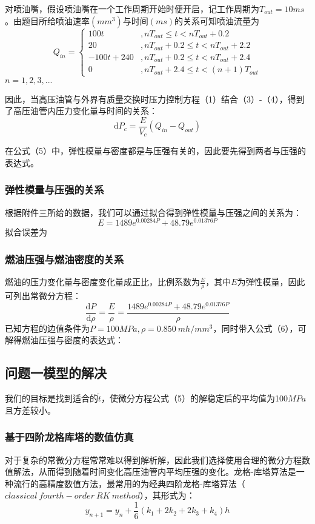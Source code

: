 \documentclass[withoutpreface,bwprint]{cumcmthesis} %
\begin{document}
对喷油嘴，假设喷油嘴在一个工作周期开始时便开启，记工作周期为$T_{out} = 10 ms$。由题目所给喷油速率$(mm^3)$与时间$(ms)$的关系可知喷油流量为
\begin{equation}
Q_{in} = \left\{ 
\begin{array}{ll}
100t&,nT_{out}\leq t<nT_{out}+0.2 \\
20&,nT_{out}+0.2\leq t< nT_{out}+2.2\\
-100t+240&,nT_{out}+0.2\leq t< nT_{out}+2.4\\
0&,nT_{out}+2.4\leq t <(n+1)T_{out}
\end{array}
\right.
\end{equation}
$n = 1,2,3,...$

因此，当高压油管与外界有质量交换时压力控制方程（1）结合（3）-（4），得到了高压油管内压力变化量与时间的关系：
\begin{equation}
	\mathrm{d}P_c = \frac{E}{V_c}(Q_{in} - Q_{out})
\end{equation}

在公式（5）中，弹性模量与密度都是与压强有关的，因此要先得到两者与压强的表达式。
\subsubsection{弹性模量与压强的关系}
根据附件三所给的数据，我们可以通过拟合得到弹性模量与压强之间的关系为：
\begin{equation}
E = 1489 e^{0.00284P} + 48.79 e^{0.01376 P}
\end{equation}
拟合误差为


\subsubsection{燃油压强与燃油密度的关系}
燃油的压力变化量与密度变化量成正比，比例系数为$\frac{E}{\rho}$，其中$E$为弹性模量，因此可列出常微分方程：
\begin{equation}
\frac{\mathrm{d}P}{\mathrm{d}\rho} = \frac{E}{\rho} = \frac{1489 e^{0.00284P} + 48.79 e^{0.01376 P}}{\rho}
\end{equation}
已知方程的边值条件为$P = 100MPa, \rho = 0.850\ mh/mm^3$，同时带入公式（6），可解得燃油压强与密度的表达式：
\subsection{问题一模型的解决}
我们的目标是找到适合的$\widetilde{t}$，使微分方程公式（5）的解稳定后的平均值为100$MPa$且方差较小。
\subsubsection{基于四阶龙格库塔的数值仿真}
对于复杂的常微分方程常常难以得到解析解，因此我们选择使用合理的微分方程数值解法，从而得到随着时间变化高压油管内平均压强的变化。龙格-库塔算法是一种流行的高精度数值方法，最常用的为经典四阶龙格-库塔算法（$classical\ fourth-order\ RK\ method$），其形式为：
\[
y_{n+1}=y_{n}+\frac{1}{6}(k_{1}+2k_{2}+2k_{3}+k_{4})h
\]
\end{document}

